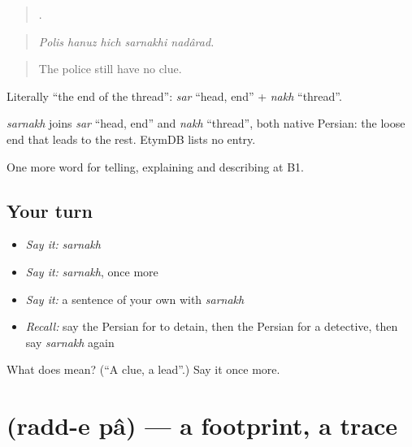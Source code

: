 \begin{quote}
    .
\end{quote}

\begin{quote}
\emph{Polis hanuz hich sarnakhi nadârad.}
\end{quote}

\begin{quote}
The police still have no clue.
\end{quote}

Literally \textquotedblleft{}the end of the thread\textquotedblright{}: \emph{sar} \textquotedblleft{}head, end\textquotedblright{} + \emph{nakh} \textquotedblleft{}thread\textquotedblright{}.

\begin{cousinweb}
\emph{sarnakh} joins \emph{sar} \textquotedblleft{}head, end\textquotedblright{} and \emph{nakh} \textquotedblleft{}thread\textquotedblright{}, both native Persian: the loose end that leads to the rest. EtymDB lists no entry.
\end{cousinweb}

\begin{grammarlens}[title={What you've built}]
One more word for telling, explaining and describing at B1.
\end{grammarlens}

\subsection*{Your turn}
\begin{itemize}
\raggedright
  \item \emph{Say it:} \emph{sarnakh}
  \item \emph{Say it:} \emph{sarnakh}, once more
  \item \emph{Say it:} a sentence of your own with \emph{sarnakh}
  \item \emph{Recall:} say the Persian for to detain, then the Persian for a detective, then say \emph{sarnakh} again
\end{itemize}

\begin{tcolorbox}[breakable,colback=teal!4,colframe=teal!35!black,title={Before you move on}]
What does  mean? (\textquotedblleft{}A clue, a lead\textquotedblright{}.) Say it once more.
\end{tcolorbox}
\section[\texorpdfstring{\fa{ردپا} (radd-e pâ)}{ردپا (radd-e pâ)}]{ (radd-e pâ) — a footprint, a trace}

